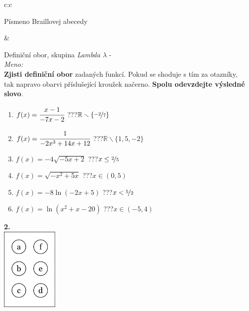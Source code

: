 \documentclass[10pt]{report}
\begin{document}
\begin{tabular}{c:c}
\begin{minipage}[c][99mm][t]{0.49\linewidth}
\begin{center}
\begin{minipage}{0.20\linewidth}
\begin{center}
{\small Písmeno Braillovej abecedy}
\end{center}
\end{minipage}
\end{center}
\end{minipage}
&
\begin{minipage}[c][99mm][t]{0.49\linewidth}
\begin{center}
\vspace{7mm}
{\huge Definiční obor, skupina \textit{Lambda $\lambda$} -}\\[4.5mm]
\textit{Meno:}\phantom{xxxxxxxxxxxxxxxxxxxxxxxxxxxxxxxxxxxxxxxxxxxxxxxxxxxxxxxxxxxxxxxxx}\\[3.5mm]
\textbf{Zjisti definiční obor} zadaných funkcí. Pokud se shoduje s tím za otazníky,\\tak napravo obarvi příslušející kroužek načerno. \textbf{Spolu odevzdejte výsledné slovo}.\\[3mm]
\begin{minipage}{0.77\linewidth}
\begin{center}
\begin{varwidth}{\textwidth}
\begin{enumerate}
\normalsize
\item $f(x)=\cfrac{x-1}{-7x-2}$\quad \dotfill\; ???\;\dotfill \quad $\mathbb{R}\smallsetminus\{\nicefrac{-2}{7}\}$
\item $f(x)=\cfrac{1}{-2x^3+14x+12}$\quad \dotfill\; ???\;\dotfill \quad $\mathbb{R}\smallsetminus\{1,5,-2\}$
\item $f(x)=-4\sqrt{-5x+2}$\quad \dotfill\; ???\;\dotfill \quad $x\leq\nicefrac{2}{5}$
\item $f(x)=\sqrt{-x^2+5x}$\quad \dotfill\; ???\;\dotfill \quad $x\in(0 , 5)$
\item $f(x)=-8\ln{(-2x+5)}$\quad \dotfill\; ???\;\dotfill \quad $x<\nicefrac{5}{2}$
\item $f(x)=\ln{(x^2+x-20)}$\quad \dotfill\; ???\;\dotfill \quad $x\in(-5 , 4)$
\end{enumerate}
\end{varwidth}
\end{center}
\end{minipage}
\begin{minipage}{0.20\linewidth}
\begin{center}
{\Huge\bfseries 2.} \\[2mm]
\includegraphics[height=40mm]{../images/braille.png}

\end{center}
\end{minipage}
\end{center}
\end{minipage}
\end{tabular}
\end{document}
